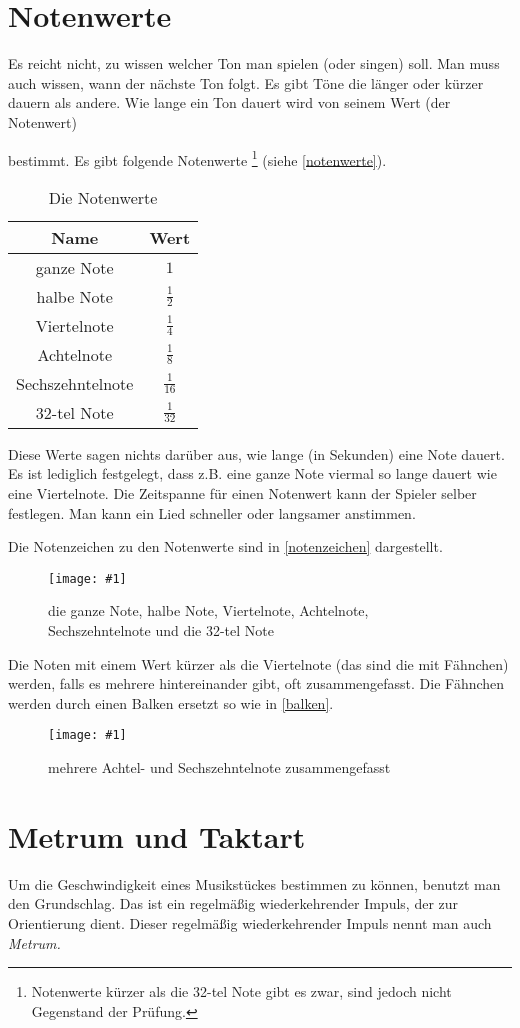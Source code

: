 \documentclass[10pt,a4paper,twoside]{report}
\newcommand{\comment}[1]{
	\marginpar{
		\textsf{#1}
	}
}
\newcommand{\image}[4]{
	\begin{figure}[!ht]
		\centering
		\texttt{[image: \#1]}
		\caption{#2}
		\label{#3}
	\end{figure}
}
\begin{document}
\section{Notenwerte}
Es reicht nicht, zu wissen welcher Ton man spielen (oder singen) soll. Man
muss auch wissen, wann der nächste Ton folgt. Es gibt Töne die 
länger oder kürzer
dauern als andere. Wie lange ein Ton dauert 
wird von seinem Wert (der Notenwert)\comment{Notenwert $\rightarrow$ Dauer}
bestimmt. Es gibt folgende Notenwerte%
\footnote{Notenwerte 
kürzer als die 32-tel Note gibt es zwar, sind jedoch 
nicht Gegenstand der Prüfung.}
(siehe \autoref{notenwerte}).
\begin{table}[!ht]
	\centering
	\begin{tabular}{|c|c|}
	\hline \textbf{Name} & \textbf{Wert} \\
	\hline ganze Note & $1$ \\ 
	\hline halbe Note & $\frac{1}{2}$ \\ 
	\hline Viertelnote & $\frac{1}{4}$ \\ 
	\hline Achtelnote & $ \frac{1}{8} $ \\ 
	\hline Sechszehntelnote & $ \frac{1}{16} $ \\ 
	\hline 32-tel Note & $ \frac{1}{32} $ \\ 
	\hline 
	\end{tabular} 
	\caption{Die Notenwerte}
	\label{notenwerte}
\end{table}
Diese Werte sagen nichts darüber aus, wie lange (in Sekunden) eine Note dauert. 
Es ist lediglich festgelegt, dass z.B. eine ganze Note 
viermal so lange dauert wie eine
Viertelnote. Die Zeitspanne für einen Notenwert kann der Spieler selber 
festlegen. Man kann ein Lied schneller oder langsamer anstimmen.

Die Notenzeichen zu den Notenwerte sind in \autoref{notenzeichen} dargestellt.%
\image{lilypond/notenwerte.png}{die ganze Note, halbe Note, Viertelnote,
Achtelnote, Sechszehntelnote und die 32-tel Note}{notenzeichen}{8}
Die Noten mit einem Wert kürzer als die Viertelnote (das sind die mit Fähnchen) 
werden, falls es mehrere hintereinander gibt, oft zusammengefasst. 
Die Fähnchen werden 
durch einen Balken ersetzt so wie in \autoref{balken}.
\image{lilypond/balken.png}{mehrere Achtel- und Sechszehntelnote zusammengefasst}{balken}{6.5}

\section{Metrum und Taktart}
Um die Geschwindigkeit eines Musikstückes bestimmen zu können, benutzt man
den Grundschlag. Das ist ein regelmäßig wiederkehrender Impuls, der zur
Orientierung dient. \comment{Metrum}Dieser regelmäßig 
wiederkehrender Impuls nennt man auch \emph{Metrum.}
\end{document}
